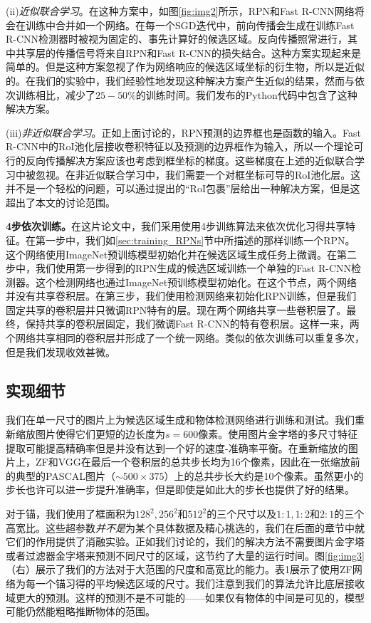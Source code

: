 \documentclass[../main.tex]{subfile}
\begin{document}
(ii)\textit{近似联合学习}。在这种方案中，如图\ref{fig:img2}所示，RPN和Fast R-CNN网络将会在训练中合并如一个网络。在每一个SGD迭代中，前向传播会生成在训练Fast R-CNN检测器时被视为固定的、事先计算好的候选区域。反向传播照常进行，其中共享层的传播信号将来自RPN和Fast R-CNN的损失结合。这种方案实现起来是简单的。但是这种方案忽视了作为网络响应的候选区域坐标的衍生物，所以是近似的。在我们的实验中，我们经验性地发现这种解决方案产生近似的结果，然而与依次训练相比，减少了$25-50\%$的训练时间。我们发布的Python代码中包含了这种解决方案。

(iii)\textit{非近似联合学习}。正如上面讨论的，RPN预测的边界框也是函数的输入。Fast R-CNN中的RoI池化层接收卷积特征以及预测的边界框作为输入，所以一个理论可行的反向传播解决方案应该也考虑到框坐标的梯度。这些梯度在上述的近似联合学习中被忽视。在非近似联合学习中，我们需要一个对框坐标可导的RoI池化层。这并不是一个轻松的问题，可以通过\cite{15}提出的“RoI包裹”层给出一种解决方案，但是这超出了本文的讨论范围。

\textbf{4步依次训练。}在这片论文中，我们采用使用4步训练算法来依次优化习得共享特征。在第一步中，我们如\ref{sec:training_RPNs}节中所描述的那样训练一个RPN。这个网络使用ImageNet预训练模型初始化并在候选区域生成任务上微调。在第二步中，我们使用第一步得到的RPN生成的候选区域训练一个单独的Fast R-CNN检测器。这个检测网络也通过ImageNet预训练模型初始化。在这个节点，两个网络并没有共享卷积层。在第三步，我们使用检测网络来初始化RPN训练，但是我们固定共享的卷积层并只微调RPN特有的层。现在两个网络共享一些卷积层了。最终，保持共享的卷积层固定，我们微调Fast R-CNN的特有卷积层。这样一来，两个网络共享相同的卷积层并形成了一个统一网络。类似的依次训练可以重复多次，但是我们发现收效甚微。

\subsection{实现细节}

我们在单一尺寸的图片上为候选区域生成和物体检测网络进行训练和测试\cite{fastrcnn,spp}。我们重新缩放图片使得它们更短的边长度为$s=600$像素\cite{fastrcnn}。使用图片金字塔的多尺寸特征提取可能提高精确率但是并没有达到一个好的速度-准确率平衡\cite{fastrcnn}。在重新缩放的图片上，ZF和VGG在最后一个卷积层的总共步长均为16个像素，因此在一张缩放前的典型的PASCAL图片（$\sim 500 \times 375$）上的总共步长大约是10个像素。虽然更小的步长也许可以进一步提升准确率，但是即使是如此大的步长也提供了好的结果。

对于锚，我们使用了框面积为$128^2, 256^2$和$512^2$的三个尺寸以及$1:1, 1:2$和$2:1$的三个高宽比。这些超参数\textit{并不是}为某个具体数据及精心挑选的，我们在后面的章节中就它们的作用提供了消融实验。正如我们讨论的，我们的解决方法不需要图片金字塔或者过滤器金字塔来预测不同尺寸的区域，这节约了大量的运行时间。图\ref{fig:img3}（右）展示了我们的方法对于大范围的尺度和高宽比的能力。表1展示了使用ZF网络为每一个锚习得的平均候选区域的尺寸。我们注意到我们的算法允许比底层接收域更大的预测。这样的预测不是不可能的——如果仅有物体的中间是可见的，模型可能仍然能粗略推断物体的范围。
\end{document}
